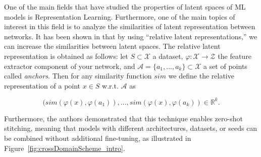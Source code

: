 \documentclass[../main.tex]{subfiles}
\begin{document}
\begin{sloppypar}
One of the main fields that have studied the properties of latent spaces of ML models is Representation Learning. Furthermore, one of the main topics of interest in this field is to analyze the similarities of latent representation between networks. It has been shown in \cite{moschella_relative_2022} that by using ``relative latent representations,'' we can increase the similarities between latent spaces. The relative latent representation is obtained as follows: let $S\subset\mathcal{X}$ a dataset, $\varphi: \mathcal{X} \to \mathcal{Z}$ the feature extractor component of your network, and ${\mathcal{A}=\{a_1, ..., a_k\}\subset\mathcal{X}}$ a set of points called \emph{anchors}. Then for any similarity function $sim$ we define the relative representation of a point $x\in S$  w.r.t. $\mathcal{A}$ as    
\end{sloppypar}

\[
(sim(\varphi(x), \varphi(a_1)), ..., sim(\varphi(x), \varphi(a_k))\in \mathbb{R}^k.
\]

Furthermore, the authors demonstrated that this technique enables zero-shot stitching, meaning that models with different architectures, datasets, or seeds can be combined without additional fine-tuning, as illustrated in Figure~\ref{fig:crossDomainScheme_intro}.\\
\end{document}
